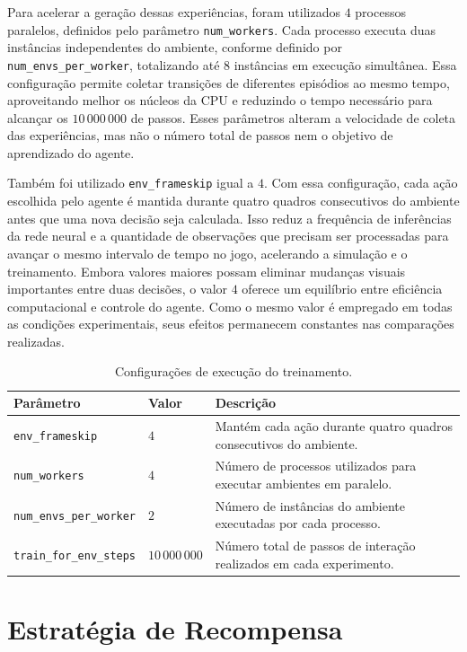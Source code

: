 Para acelerar a geração dessas experiências, foram utilizados $4$ processos paralelos, definidos pelo parâmetro \texttt{num\_workers}. Cada processo executa duas instâncias independentes do ambiente, conforme definido por \texttt{num\_envs\_per\_worker}, totalizando até $8$ instâncias em execução simultânea. Essa configuração permite coletar transições de diferentes episódios ao mesmo tempo, aproveitando melhor os núcleos da CPU e reduzindo o tempo necessário para alcançar os $10\,000\,000$ de passos. Esses parâmetros alteram a velocidade de coleta das experiências, mas não o número total de passos nem o objetivo de aprendizado do agente.

Também foi utilizado \texttt{env\_frameskip} igual a $4$. Com essa configuração, cada ação escolhida pelo agente é mantida durante quatro quadros consecutivos do ambiente antes que uma nova decisão seja calculada. Isso reduz a frequência de inferências da rede neural e a quantidade de observações que precisam ser processadas para avançar o mesmo intervalo de tempo no jogo, acelerando a simulação e o treinamento. Embora valores maiores possam eliminar mudanças visuais importantes entre duas decisões, o valor $4$ oferece um equilíbrio entre eficiência computacional e controle do agente. Como o mesmo valor é empregado em todas as condições experimentais, seus efeitos permanecem constantes nas comparações realizadas.

\begin{table}[h!]
\centering
\small
\caption{Configurações de execução do treinamento.}
\label{tab:configuracao-execucao}
\begin{tabular}{l|l|p{7cm}}
\hline
\textbf{Parâmetro} & \textbf{Valor} & \textbf{Descrição} \\
\hline
\texttt{env\_frameskip} & $4$ & Mantém cada ação durante quatro quadros consecutivos do ambiente. \\
\texttt{num\_workers} & $4$ & Número de processos utilizados para executar ambientes em paralelo. \\
\texttt{num\_envs\_per\_worker} & $2$ & Número de instâncias do ambiente executadas por cada processo. \\
\texttt{train\_for\_env\_steps} & $10\,000\,000$ & Número total de passos de interação realizados em cada experimento. \\
\hline
\end{tabular}
\end{table}

\section{Estratégia de Recompensa}
\label{sec:estrategia-recompensa}

